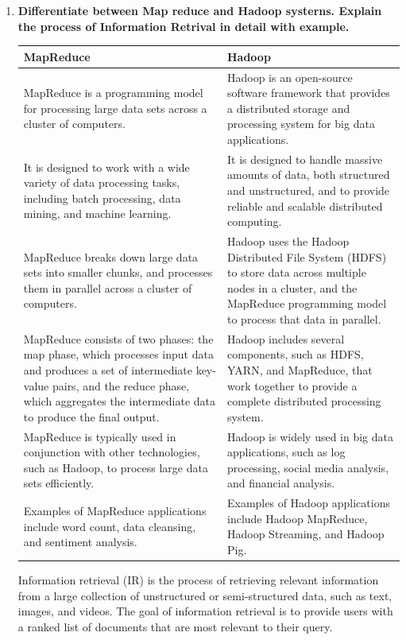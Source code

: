 \documentclass[12pt]{article}
\begin{document}
\begin{enumerate}
\item {\bfseries Differentiate between Map reduce and Hadoop systerns. Explain the process of
Information Retrival in detail with example.\\}
\begin{longtable}{|p{6cm}|p{6cm}|}
    \hline
    \textbf{MapReduce} & \textbf{Hadoop} \\
    \hline
    MapReduce is a programming model for processing large data sets across a cluster of computers. & Hadoop is an open-source software framework that provides a distributed storage and processing system for big data applications. \\
    \hline
    It is designed to work with a wide variety of data processing tasks, including batch processing, data mining, and machine learning. & It is designed to handle massive amounts of data, both structured and unstructured, and to provide reliable and scalable distributed computing. \\
    \hline
    MapReduce breaks down large data sets into smaller chunks, and processes them in parallel across a cluster of computers. & Hadoop uses the Hadoop Distributed File System (HDFS) to store data across multiple nodes in a cluster, and the MapReduce programming model to process that data in parallel. \\
    \hline
    MapReduce consists of two phases: the map phase, which processes input data and produces a set of intermediate key-value pairs, and the reduce phase, which aggregates the intermediate data to produce the final output. & Hadoop includes several components, such as HDFS, YARN, and MapReduce, that work together to provide a complete distributed processing system. \\
    \hline
    MapReduce is typically used in conjunction with other technologies, such as Hadoop, to process large data sets efficiently. & Hadoop is widely used in big data applications, such as log processing, social media analysis, and financial analysis. \\
    \hline
    Examples of MapReduce applications include word count, data cleansing, and sentiment analysis. & Examples of Hadoop applications include Hadoop MapReduce, Hadoop Streaming, and Hadoop Pig. \\
    \hline
    \end{longtable}
    Information retrieval (IR) is the process of retrieving relevant information from a large collection of unstructured or semi-structured data, such as text, images, and videos. The goal of information retrieval is to provide users with a ranked list of documents that are most relevant to their query.


\end{enumerate}
\end{document}
